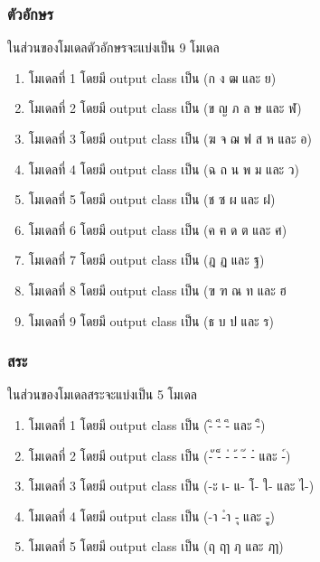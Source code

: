 \documentclass[12pt,oneside,openright,a4paper]{cpe-thai-project}
\begin{document}
    \subsubsection{ตัวอักษร}
    ในส่วนของโมเดลตัวอักษรจะแบ่งเป็น 9 โมเดล
    \begin{enumerate}
      \item โมเดลที่ 1 โดยมี output class เป็น (ก ง ฒ และ ย)
      \item โมเดลที่ 2 โดยมี output class เป็น (ข ญ ภ ล ษ และ ฬ)
      \item โมเดลที่ 3 โดยมี output class เป็น (ฆ จ ฌ ฟ ส ห และ อ)
      \item โมเดลที่ 4 โดยมี output class เป็น (ฉ ถ น พ ม และ ว)
      \item โมเดลที่ 5 โดยมี output class เป็น (ช ซ ผ และ ฝ)
      \item โมเดลที่ 6 โดยมี output class เป็น (ค ฅ ด ต และ ศ)
      \item โมเดลที่ 7 โดยมี output class เป็น (ฎ ฏ และ ฐ)
      \item โมเดลที่ 8 โดยมี output class เป็น (ฃ ฑ ณ ท และ ฮ
      \item โมเดลที่ 9 โดยมี output class เป็น (ธ บ ป และ ร)
    \end{enumerate}
    \subsubsection{สระ}
    ในส่วนของโมเดลสระจะแบ่งเป็น 5 โมเดล
    \begin{enumerate}
      \item โมเดลที่ 1 โดยมี output class เป็น (-ิ -ี -ึ และ -ื)
      \item โมเดลที่ 2 โดยมี output class เป็น (-ั -็ -่ -้ -๊ -๋ และ -์)
      \item โมเดลที่ 3 โดยมี output class เป็น (-ะ เ- แ- โ- ใ- และ ไ-)
      \item โมเดลที่ 4 โดยมี output class เป็น (-า -ํา -ุ และ -ู)
      \item โมเดลที่ 5 โดยมี output class เป็น (ฤ ฤา ฦ และ ฦา)
  
    \end{enumerate}
\newpage
\end{document}

